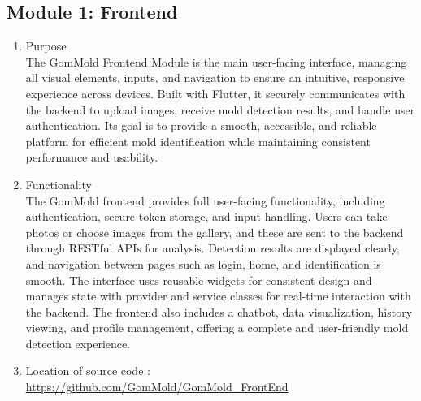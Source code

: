 \documentclass[conference]{IEEEtran}
\begin{document}
\subsection{Module 1: Frontend}
\begin{enumerate}
    \item[1)] Purpose\\
    The GomMold Frontend Module is the main user-facing interface, managing all visual elements, inputs, and navigation to ensure an intuitive, responsive experience across devices. Built with Flutter, it securely communicates with the backend to upload images, receive mold detection results, and handle user authentication. Its goal is to provide a smooth, accessible, and reliable platform for efficient mold identification while maintaining consistent performance and usability.\\ 
    \item[2)] Functionality \\
    The GomMold frontend provides full user-facing functionality, including authentication, secure token storage, and input handling. Users can take photos or choose images from the gallery, and these are sent to the backend through RESTful APIs for analysis. Detection results are displayed clearly, and navigation between pages such as login, home, and identification is smooth. The interface uses reusable widgets for consistent design and manages state with provider and service classes for real-time interaction with the backend. The frontend also includes a chatbot, data visualization, history viewing, and profile management, offering a complete and user-friendly mold detection experience. \\
    
    \item[3)]Location of source code : \url{https://github.com/GomMold/GomMold_FrontEnd}\\ 
    
\end{enumerate}
\end{document}
